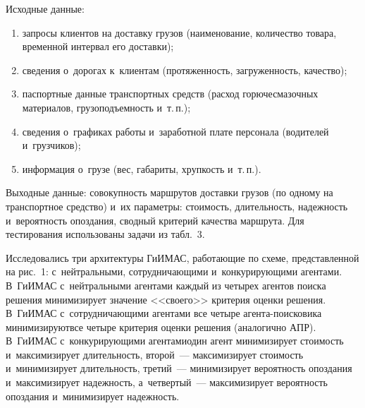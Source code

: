 \begin{multicols}{2}
  Исходные данные: 
  \begin{enumerate}[(1)]
  \item запросы клиентов на доставку грузов (наименование, 
количество товара, временной интервал его доставки); 
  \item сведения о~дорогах 
к~клиентам (протяженность, загруженность, качество); 
  \item паспортные данные 
транспортных средств (расход го\-рю\-че\-сма\-зоч\-ных материалов, 
грузоподъемность и~т.\,п.); 
  \item сведения о~графиках работы и~заработной плате 
персонала (водителей и~грузчиков); 
  \item информация о~грузе (вес, габариты, 
хрупкость и~т.\,п.). 
\end{enumerate}
  
  Выходные данные: совокупность маршрутов доставки грузов (по одному на 
транспортное средство) и~их параметры: стоимость, длительность, надежность 
и~вероятность опоздания, сводный критерий качества маршрута. Для 
тестирования использованы задачи из табл.~3.
  
  Исследовались три архитектуры ГиИМАС, работающие по схеме, 
представленной на рис.~1: с~нейт\-раль\-ны\-ми, сотрудничающими 
и~конкурирующими агентами. В~ГиИМАС с~нейтральными агентами каждый 
из четырех агентов поиска решения минимизирует значение <<своего>> 
критерия оценки решения. В~ГиИМАС с~сотрудничающими агентами все 
четыре аген\-та-по\-иско\-ви\-ка минимизируют\linebreak все четыре критерия оценки решения 
(аналогично АПР). В~ГиИМАС с~конкурирующими агентами\linebreak один агент 
минимизирует стоимость и~максимизирует длительность, второй~--- 
максимизирует \mbox{стоимость} и~минимизирует длительность, \mbox{третий}~--- 
минимизирует вероятность опоздания и~максимизирует надежность, 
а~четвертый~--- максимизирует вероятность опоздания и~минимизирует 
\mbox{надежность}. 


\end{multicols}
